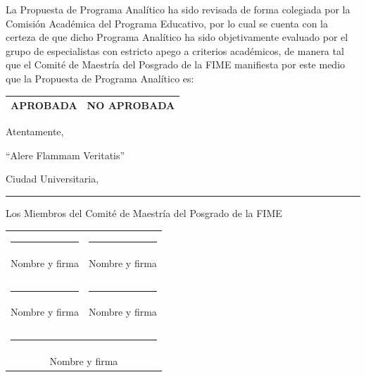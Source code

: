 \documentclass{article}
\renewcommand{\arraystretch}{2.0}
\begin{document}
\newpage

La Propuesta de Programa Anal\'{i}tico ha sido revisada de forma colegiada por la Comisi\'{o}n Acad\'{e}mica del
Programa Educativo, por lo cual se cuenta con la certeza de que dicho Programa Anal\'{i}tico ha sido
objetivamente evaluado por el grupo de especialistas con estricto apego a criterios acad\'{e}micos, de manera
tal que el Comit\'{e} de Maestr\'{i}a del Posgrado de la FIME manifiesta por este medio que la Propuesta de
Programa Anal\'{i}tico es:

\label{lastpage}

\begin{center}
  
\begin{tabular}{|c|c|}
    \hline 
    APROBADA & NO APROBADA \\
    \hline
\end{tabular}

\quad

  Atentamente,

  ``Alere Flammam Veritatis''

  Ciudad Universitaria, \rule{5cm}{1pt}

  \quad
  
  Los Miembros del Comit\'{e} de Maestr\'{i}a del Posgrado de la FIME

  \vspace*{2cm}
  
  \renewcommand{\arraystretch}{1.0}  
  \begin{tabular}{cc}
\rule{5cm}{1pt} & \rule{5cm}{1pt} \\
    Nombre y firma
    &  Nombre y firma \\
    \phantom{xxx} & \phantom{xxx} \\
        \phantom{xxx} & \phantom{xxx} \\
    \rule{5cm}{1pt} & \rule{5cm}{1pt} \\
     Nombre y firma
     &  Nombre y firma \\
     \phantom{xxx} & \phantom{xxx} \\
     \phantom{xxx} & \phantom{xxx} \\     
    \multicolumn{2}{c}{\rule{5cm}{1pt}} \\
\multicolumn{2}{c}{Nombre y firma}
  \end{tabular}

  

\end{center}
\end{document}
